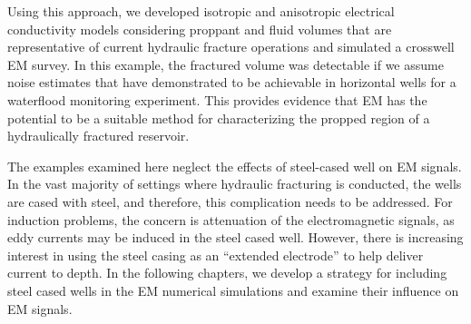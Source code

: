 Using this approach, we developed isotropic and anisotropic electrical conductivity models considering proppant and fluid volumes that are representative of current hydraulic fracture operations and simulated a crosswell EM survey. In this example, the fractured volume was detectable if we assume noise estimates that have demonstrated to be achievable in horizontal wells for a waterflood monitoring experiment. This provides evidence that EM has the potential to be a suitable method for characterizing the propped region of a hydraulically fractured reservoir.

The examples examined here neglect the effects of steel-cased well on EM signals. In the vast majority of settings where hydraulic fracturing is conducted, the wells are cased with steel, and therefore, this complication  needs to be addressed. For induction problems, the concern is attenuation of the electromagnetic signals, as eddy currents may be induced in the steel cased well. However, there is increasing interest in using the steel casing as an ``extended electrode'' to help deliver current to depth. In the following chapters, we develop a strategy for including steel cased wells in the EM numerical simulations and examine their influence on EM signals.

